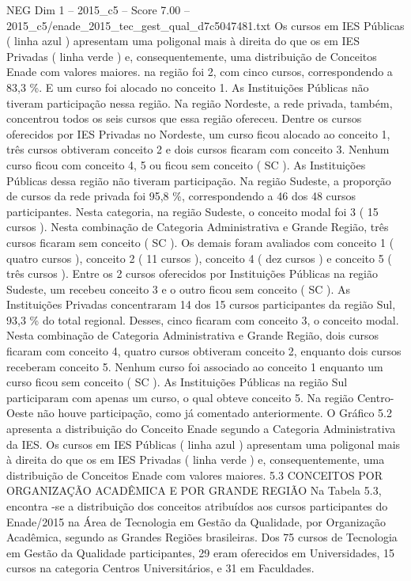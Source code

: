 \begin{textsample}{NEG Dim 1 – 2015\_c5 – Score 7.00 – 2015\_c5/enade\_2015\_tec\_gest\_qual\_d7c5047481.txt}
Os cursos em IES Públicas ( linha azul ) apresentam uma poligonal mais à direita do que os em IES Privadas ( linha verde ) e, consequentemente, uma distribuição de Conceitos Enade com valores maiores. na região foi 2, com cinco cursos, correspondendo a 83,3 \%.
E um curso foi alocado no conceito 1.
As Instituições Públicas não tiveram participação nessa região.
Na região Nordeste, a rede privada, também, concentrou todos os seis cursos que essa região ofereceu.
Dentre os cursos oferecidos por IES Privadas no Nordeste, um curso ficou alocado ao conceito 1, três cursos obtiveram conceito 2 e dois cursos ficaram com conceito 3.
Nenhum curso ficou com conceito 4, 5 ou ficou sem conceito ( SC ).
As Instituições Públicas dessa região não tiveram participação.
Na região Sudeste, a proporção de cursos da rede privada foi 95,8 \%, correspondendo a 46 dos 48 cursos participantes.
Nesta categoria, na região Sudeste, o conceito modal foi 3 ( 15 cursos ).
Nesta combinação de Categoria Administrativa e Grande Região, três cursos ficaram sem conceito ( SC ).
Os demais foram avaliados com conceito 1 ( quatro cursos ), conceito 2 ( 11 cursos ), conceito 4 ( dez cursos ) e conceito 5 ( três cursos ).
Entre os 2 cursos oferecidos por Instituições Públicas na região Sudeste, um recebeu conceito 3 e o outro ficou sem conceito ( SC ).
As Instituições Privadas concentraram 14 dos 15 cursos participantes da região Sul, 93,3 \% do total regional.
Desses, cinco ficaram com conceito 3, o conceito modal.
Nesta combinação de Categoria Administrativa e Grande Região, dois cursos ficaram com conceito 4, quatro cursos obtiveram conceito 2, enquanto dois cursos receberam conceito 5.
Nenhum curso foi associado ao conceito 1 enquanto um curso ficou sem conceito ( SC ).
As Instituições Públicas na região Sul participaram com apenas um curso, o qual obteve conceito 5.
Na região Centro-Oeste não houve participação, como já comentado anteriormente.
O Gráfico 5.2 apresenta a distribuição do Conceito Enade segundo a Categoria Administrativa da IES.
Os cursos em IES Públicas ( linha azul ) apresentam uma poligonal mais à direita do que os em IES Privadas ( linha verde ) e, consequentemente, uma distribuição de Conceitos Enade com valores maiores. 5.3 CONCEITOS POR ORGANIZAÇÃO ACADÊMICA E POR GRANDE REGIÃO Na Tabela 5.3, encontra -se a distribuição dos conceitos atribuídos aos cursos participantes do Enade/2015 na Área de Tecnologia em Gestão da Qualidade, por Organização Acadêmica, segundo as Grandes Regiões brasileiras.
Dos 75 cursos de Tecnologia em Gestão da Qualidade participantes, 29 eram oferecidos em Universidades, 15 cursos na categoria Centros Universitários, e 31 em Faculdades.

\end{textsample}
